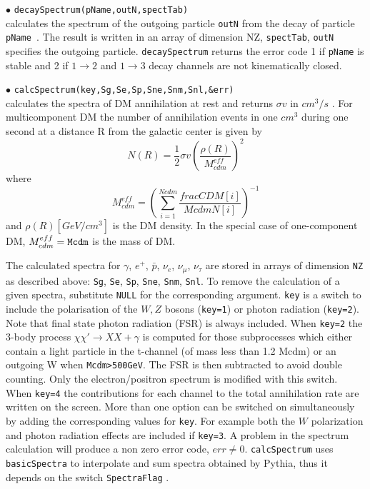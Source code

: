 \documentclass[12pt,a4paper]{article}
\begin{document}
\noindent
$\bullet$ \verb|decaySpectrum(pName,outN,spectTab)|\\
calculates the spectrum of the outgoing particle  {\tt  outN} from the decay of particle {\tt pName }.  The result is written in an array of dimension NZ, \verb|spectTab|, {\tt  outN}  specifies the outgoing particle.  {\tt decaySpectrum} returns  the  error code 1  if  {\tt pName} is stable and 2 if  $1\to 2$ and  $1\to 3$ decay channels are not kinematically closed.

 
  
\noindent
$\bullet$ \verb|calcSpectrum(key,Sg,Se,Sp,Sne,Snm,Snl,&err)|\\
calculates  the spectra  of DM annihilation 
at rest and returns $\sigma v$ in $cm^3/s$ . 
For multicomponent DM the number of annihilation events in one $cm^{3}$   during one second  at a distance R from the  galactic center is given by
\begin{equation}
      N(R)=\frac{1}{2} \sigma v \left( \frac{\rho(R)}{M_{cdm}^{eff}}\right)^2
\end{equation}
where 
\begin{equation} 
  \label{McdmEff}
  M_{cdm}^{eff}= \left( \sum_{i=1}^{Ncdm} \frac{fracCDM[i]}{McdmN[i]}\right)^{-1}
\end{equation}  
and $\rho(R) [GeV/cm^3]$ is the DM density. In the special  case of one-component DM,  $M_{cdm}^{eff}={\tt Mcdm}$  is the mass  of DM. 


The calculated spectra
for $\gamma$, $e^+$, $\bar{p}$, $\nu_e$, $\nu_{\mu}$, $\nu_{\tau}$ 
are stored in arrays of dimension \verb|NZ| as described above: \verb|Sg|, \verb|Se|, \verb|Sp|, \verb|Sne|, \verb|Snm|, \verb|Snl|. 
 To remove the calculation of a given spectra, substitute  
\verb|NULL| for the corresponding argument. 
\verb|key| is a switch to include the polarisation of the  $W,Z$ bosons (\verb|key=1|) or
 photon radiation (\verb|key=2|).  
 Note that final state photon radiation (FSR) is always included.
When \verb|key=2| the 3-body  process $\chi\chi'\rightarrow XX +\gamma$ is computed for those subprocesses which either contain a light particle in the t-channel (of mass less than 1.2 Mcdm) or an outgoing W when \verb|Mcdm>500GeV|. The FSR is then subtracted to avoid double counting.
Only the electron/positron spectrum is modified with this switch.
When \verb|key=4| the contributions  for each  channel to the total
annihilation rate  are written on the screen. More than one option
can be switched on simultaneously by adding the corresponding values for \verb|key|. 
For example both the $W$ polarization and photon radiation effects  are included if
\verb|key=3|.
A problem in the spectrum calculation will produce a non zero error code, $err\neq
0$. {\tt calcSpectrum} uses {\tt basicSpectra} to  interpolate and sum spectra obtained by Pythia, thus it depends on the switch  {\tt SpectraFlag} .\\
\end{document}
